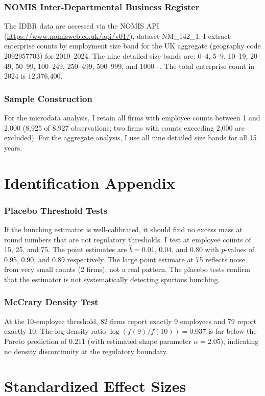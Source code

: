 \documentclass[12pt]{article}
\begin{document}
\subsubsection*{NOMIS Inter-Departmental Business Register} The IDBR data are accessed via the NOMIS API (\url{https://www.nomisweb.co.uk/api/v01/}), dataset NM\_142\_1. I extract enterprise counts by employment size band for the UK aggregate (geography code 2092957703) for 2010--2024. The nine detailed size bands are: 0--4, 5--9, 10--19, 20--49, 50--99, 100--249, 250--499, 500--999, and 1000+. The total enterprise count in 2024 is 12,376,400.

\subsubsection*{Sample Construction} For the microdata analysis, I retain all firms with employee counts between 1 and 2,000 (8,925 of 8,927 observations; two firms with counts exceeding 2,000 are excluded). For the aggregate analysis, I use all nine detailed size bands for all 15 years.

\section{Identification Appendix}

\subsubsection*{Placebo Threshold Tests} If the bunching estimator is well-calibrated, it should find no excess mass at round numbers that are not regulatory thresholds. I test at employee counts of 15, 25, and 75. The point estimates are $\hat{b} = 0.01$, $0.04$, and $0.80$ with $p$-values of 0.95, 0.90, and 0.89 respectively. The large point estimate at 75 reflects noise from very small counts (2 firms), not a real pattern. The placebo tests confirm that the estimator is not systematically detecting spurious bunching.

\subsubsection*{McCrary Density Test} At the 10-employee threshold, 82 firms report exactly 9 employees and 79 report exactly 10. The log-density ratio $\log(f(9)/f(10)) = 0.037$ is far below the Pareto prediction of 0.211 (with estimated shape parameter $\alpha = 2.05$), indicating no density discontinuity at the regulatory boundary.

\section{Standardized Effect Sizes}
\label{sec:sde}


\end{document}
